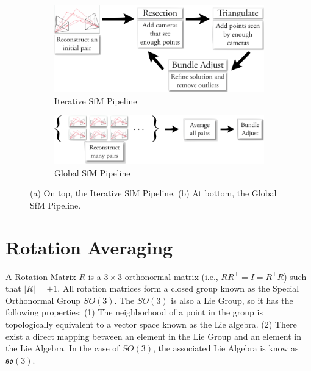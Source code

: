\documentclass[conference, 12pt]{acmsiggraph}
\begin{document}
\begin{figure}[H]
  \centering
  \begin{subfigure}{0.5\textwidth}
  	\centering
    \includegraphics[width=1.0\textwidth]{images/iterative_sfm.png}
	\caption{Iterative SfM Pipeline}
	\label{fig:iterative}
  \end{subfigure}

  \begin{subfigure}{0.5\textwidth}
  	\centering
    \includegraphics[width=1.0\textwidth]{images/global_sfm.png}
	\caption{Global SfM Pipeline}
	\label{fig:global}
  \end{subfigure}
  \caption{(a) On top, the Iterative SfM Pipeline. (b) At bottom, the Global SfM Pipeline.}
  \label{fig:pipelines}
\end{figure}

\section{Rotation Averaging}

A Rotation Matrix $R$ is a $3 \times 3$ orthonormal matrix (i.e., $RR^\intercal = I = R^\intercal R$) such that $|R| = +1$. All rotation matrices form a closed group known as the Special Orthonormal Group $SO(3)$. The $SO(3)$ is also a Lie Group, so it has the following properties: (1) The neighborhood of a point in the group is topologically equivalent to a vector space known as the Lie algebra. (2) There exist a direct mapping between an element in the Lie Group and an element in the Lie Algebra. In the case of $SO(3)$, the associated Lie Algebra is know as $\mathfrak{so}(3)$.
\end{document}

